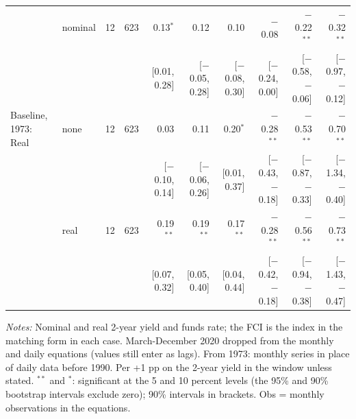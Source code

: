 \begin{table}[tp]
{\begin{tabular}{llcrrrrrrr}
 & nominal & 12 & 623 & 0.13$^{*}$ & 0.12 & 0.10 & $-$0.08 & $-$0.22$^{**}$ & $-$0.32$^{**}$\\
 & & & & {\scriptsize [0.01, 0.28]} & {\scriptsize [$-$0.05, 0.28]} & {\scriptsize [$-$0.08, 0.30]} & {\scriptsize [$-$0.24, 0.00]} & {\scriptsize [$-$0.58, $-$0.06]} & {\scriptsize [$-$0.97, $-$0.12]}\\
\addlinespace
Baseline, 1973: Real & none & 12 & 623 & 0.03 & 0.11 & 0.20$^{*}$ & $-$0.28$^{**}$ & $-$0.53$^{**}$ & $-$0.70$^{**}$\\
 & & & & {\scriptsize [$-$0.10, 0.14]} & {\scriptsize [$-$0.06, 0.26]} & {\scriptsize [0.01, 0.37]} & {\scriptsize [$-$0.43, $-$0.18]} & {\scriptsize [$-$0.87, $-$0.33]} & {\scriptsize [$-$1.34, $-$0.40]}\\
 & real & 12 & 623 & 0.19$^{**}$ & 0.19$^{**}$ & 0.17$^{**}$ & $-$0.28$^{**}$ & $-$0.56$^{**}$ & $-$0.73$^{**}$\\
 & & & & {\scriptsize [0.07, 0.32]} & {\scriptsize [0.05, 0.40]} & {\scriptsize [0.04, 0.44]} & {\scriptsize [$-$0.42, $-$0.18]} & {\scriptsize [$-$0.94, $-$0.38]} & {\scriptsize [$-$1.43, $-$0.47]}\\
\bottomrule\end{tabular}}
\begin{flushleft}\footnotesize\textit{Notes:} Nominal and real 2-year yield and funds rate; the FCI is the index in the matching form in each case. March-December 2020 dropped from the monthly and daily equations (values still enter as lags). From 1973: monthly series in place of daily data before 1990. Per +1 pp on the 2-year yield in the window unless stated. $^{**}$ and $^{*}$: significant at the 5 and 10 percent levels (the 95\% and 90\% bootstrap intervals exclude zero); 90\% intervals in brackets. Obs = monthly observations in the equations.\end{flushleft}
\end{table}

